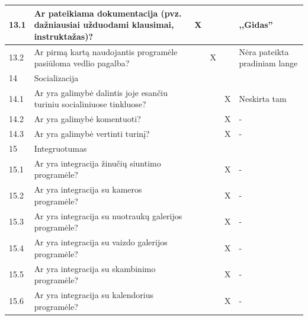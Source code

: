 \documentclass{VUMIFPSkursinis}
\begin{document}
\begin{longtable}[c]{|p{1cm}|p{4cm}|p{1cm}|p{1cm}|p{1.6cm}|p{4cm}|}
13.1  & Ar pateikiama dokumentacija (pvz. dažniausiai užduodami klausimai, instruktažas)?                    &  X  &     &           &   ,,Gidas''          \\ \hline
13.2  & Ar pirmą kartą naudojantis programėle pasiūloma vedlio pagalba?                                      &     &  X  &           &     Nėra pateikta pradiniam lange        \\ \hline
14    & \multicolumn{5}{l|}{Socializacija}                                                                                                         \\ \hline
14.1  & Ar yra galimybė dalintis joje esančiu turiniu socialiniuose tinkluose?                               &     &     &     X     &   Neskirta tam  \\ \hline
14.2  & Ar yra galimybė komentuoti?                                                                          &     &     &     X     &   -          \\ \hline
14.3  & Ar yra galimybė vertinti turinį?                                                                     &     &     &     X     &   -          \\ \hline
15    & \multicolumn{5}{l|}{Integruotumas}                                                                                                         \\ \hline
15.1  & Ar yra integracija žinučių siuntimo programėle?                                                      &     &     &     X     &   -         \\ \hline
15.2  & Ar yra integracija su kameros programėle?                                                            &     &     &     X     &   -         \\ \hline
15.3  & Ar yra integracija su nuotraukų galerijos programėle?                                                &     &     &     X     &   -         \\ \hline
15.4  & Ar yra integracija su vaizdo galerijos programėle?                                                   &     &     &     X     &   -         \\ \hline
15.5  & Ar yra integracija su skambinimo programėle?                                                         &     &     &     X     &   -         \\ \hline
15.6  & Ar yra integracija su kalendorius programėle?                                                        &     &     &     X     &   -         \\ \hline

\end{longtable}
\end{document}
